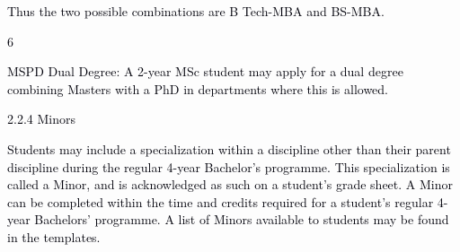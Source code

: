 \documentclass[12pt]{article}
\begin{document}
\vspace{\baselineskip}
\begin{adjustwidth}{0.71in}{0.0in}
{\fontsize{10pt}{12.0pt}\selectfont \textcolor[HTML]{00000A}{Thus the two possible combinations are B Tech-MBA and BS-MBA.}\par}\par

\end{adjustwidth}


\vspace{\baselineskip}

\vspace{\baselineskip}
\begin{Center}
\textcolor[HTML]{00000A}{6}
\end{Center}\par


\vspace{\baselineskip}
\begin{adjustwidth}{0.0in}{0.06in}
{\fontsize{10pt}{12.0pt}\selectfont \textcolor[HTML]{00000A}{MSPD Dual Degree: A 2-year MSc student may apply for a dual degree combining Masters with a PhD in departments where this is allowed.}\par}\par

\end{adjustwidth}


\vspace{\baselineskip}
{\fontsize{10pt}{12.0pt}\selectfont \textcolor[HTML]{00000A}{2.2.4 Minors}\par}\par


\vspace{\baselineskip}
\begin{justify}
{\fontsize{10pt}{12.0pt}\selectfont \textcolor[HTML]{00000A}{Students may include a specialization within a discipline other than their parent discipline during the regular 4-year Bachelor's programme. This specialization is called a Minor, and is acknowledged as such on a student's grade sheet. A Minor can be completed within the time and credits required for a student's regular 4-year Bachelors’ programme. A list of Minors available to students may be found in the templates.}\par}
\end{justify}\par


\vspace{\baselineskip}
\end{document}
